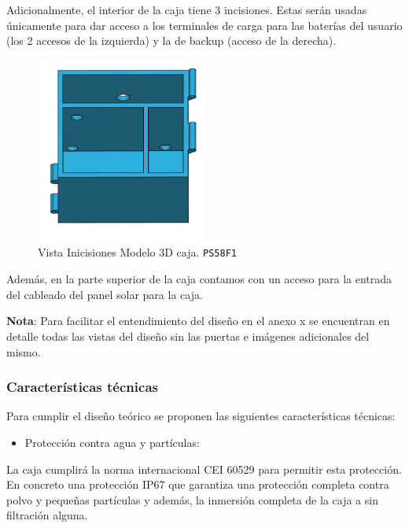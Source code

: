 Adicionalmente, el interior de la caja tiene 3 incisiones. Estas serán usadas únicamente para dar acceso a los terminales de carga para las baterías del usuario (los 2 accesos de la izquierda) y la de backup (acceso de la derecha).

\begin{figure}[H]
    \centering
    \includegraphics[width=0.5\textwidth]{images/4-DesarrolloTeorico/4-1-caja/CAJA_3D_ACCESOS.png}
    \caption{Vista Inicisiones Modelo 3D caja. \texttt{PS58F1}}
    \label{fig:DesarrolloTeorico/Caja/CAJA_3D_ACCESOS}
\end{figure}


Además, en la parte superior de la caja contamos con un acceso para la entrada del cableado del panel solar para la caja.

\textbf{Nota}: Para facilitar el entendimiento del diseño en el anexo x se encuentran en detalle todas las vistas del diseño sin las puertas e imágenes adicionales del mismo.

\subsubsection{Características técnicas}

Para cumplir el diseño teórico se proponen las siguientes características técnicas:
\begin{itemize}
    \item Protección contra agua y partículas:
\end{itemize}

La caja cumplirá la norma internacional CEI 60529 para permitir esta protección. En concreto una protección IP67 que garantiza una protección completa contra polvo y pequeñas partículas y además, la inmersión completa de la caja a sin filtración alguna. 


